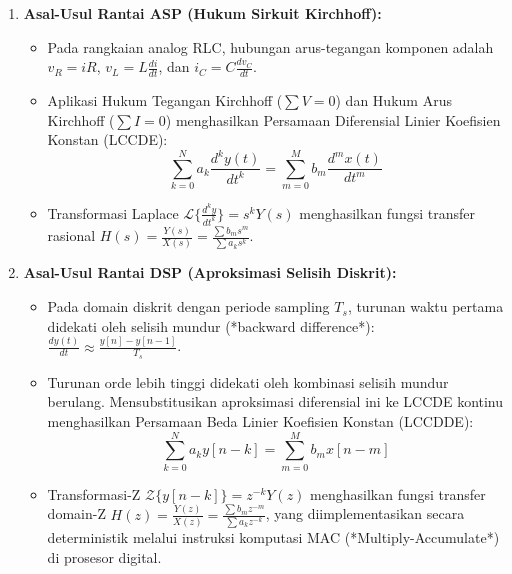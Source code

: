 \documentclass[11pt,a4paper]{article}
\begin{document}
\begin{penurunanbox}
\begin{enumerate}[leftmargin=*]
  \item \textbf{Asal-Usul Rantai ASP (Hukum Sirkuit Kirchhoff):}
  \begin{itemize}
    \item Pada rangkaian analog RLC, hubungan arus-tegangan komponen adalah $v_R = iR$, $v_L = L\frac{di}{dt}$, dan $i_C = C\frac{dv_C}{dt}$.
    \item Aplikasi Hukum Tegangan Kirchhoff ($\sum V = 0$) dan Hukum Arus Kirchhoff ($\sum I = 0$) menghasilkan Persamaan Diferensial Linier Koefisien Konstan (LCCDE):
    \begin{equation}
    \sum_{k=0}^N a_k \frac{d^k y(t)}{dt^k} = \sum_{m=0}^M b_m \frac{d^m x(t)}{dt^m}
    \end{equation}
    \item Transformasi Laplace $\mathcal{L}\{\frac{d^k y}{dt^k}\} = s^k Y(s)$ menghasilkan fungsi transfer rasional $H(s) = \frac{Y(s)}{X(s)} = \frac{\sum b_m s^m}{\sum a_k s^k}$.
  \end{itemize}

  \item \textbf{Asal-Usul Rantai DSP (Aproksimasi Selisih Diskrit):}
  \begin{itemize}
    \item Pada domain diskrit dengan periode sampling $T_s$, turunan waktu pertama didekati oleh selisih mundur (*backward difference*): $\frac{dy(t)}{dt} \approx \frac{y[n] - y[n-1]}{T_s}$.
    \item Turunan orde lebih tinggi didekati oleh kombinasi selisih mundur berulang. Mensubstitusikan aproksimasi diferensial ini ke LCCDE kontinu menghasilkan Persamaan Beda Linier Koefisien Konstan (LCCDDE):
    \begin{equation}
    \sum_{k=0}^N a_k y[n-k] = \sum_{m=0}^M b_m x[n-m]
    \end{equation}
    \item Transformasi-Z $\mathcal{Z}\{y[n-k]\} = z^{-k} Y(z)$ menghasilkan fungsi transfer domain-Z $H(z) = \frac{Y(z)}{X(z)} = \frac{\sum b_m z^{-m}}{\sum a_k z^{-k}}$, yang diimplementasikan secara deterministik melalui instruksi komputasi MAC (*Multiply-Accumulate*) di prosesor digital.
  \end{itemize}
\end{enumerate}
\end{penurunanbox}
\end{document}
